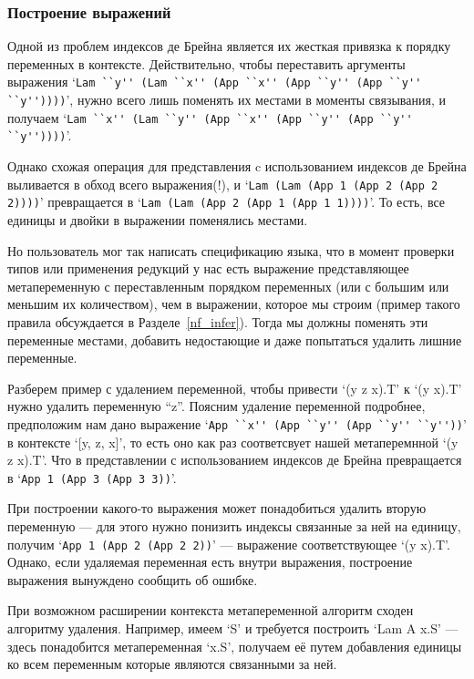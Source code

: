 \subsubsection{Построение выражений}\label{build_exp}
Одной из проблем индексов де Брейна является их жесткая привязка к порядку переменных в контексте. Действительно, чтобы переставить аргументы выражения `\lstinline{Lam ``y'' (Lam ``x'' (App ``x'' (App ``y'' (App ``y'' ``y''))))}', нужно всего лишь поменять их местами в моменты связывания, и получаем `\lstinline{Lam ``x'' (Lam ``y'' (App ``x'' (App ``y'' (App ``y'' ``y''))))}'.

Однако схожая операция для представления c использованием индексов де Брейна выливается в обход всего выражения(!), и `\lstinline{Lam (Lam (App 1 (App 2 (App 2 2))))}' превращается в `\lstinline{Lam (Lam (App 2 (App 1 (App 1 1))))}'. То есть, все единицы и двойки в выражении поменялись местами.

Но пользователь мог так написать спецификацию языка, что в момент проверки типов или применения редукций у нас есть выражение представляющее метапеременную с переставленным порядком переменных (или с большим или меньшим их количеством), чем в выражении, которое мы строим (пример такого правила обсуждается в Разделе~\ref{nf_infer}). Тогда мы должны поменять эти переменные местами, добавить недостающие и даже попытаться удалить лишние переменные.

Разберем пример с удалением переменной, чтобы привести `(y z x).T' к `(y x).T' нужно удалить переменную ``z''. Поясним удаление переменной подробнее, предположим нам дано выражение `\lstinline{App ``x'' (App ``y'' (App ``y'' ``y''))}' в контексте `[y, z, x]', то есть оно как раз соответсвует нашей метаперемнной `(y z x).T'. Что в представлении с использованием индексов де Брейна превращается в `\lstinline{App 1 (App 3 (App 3 3))}'.

При построении какого-то выражения может понадобиться удалить вторую переменную --- для этого нужно понизить индексы связанные за ней на единицу, получим `\lstinline{App 1 (App 2 (App 2 2))}' --- выражение соответствующее `(y x).T'. Однако, если удаляемая переменная есть внутри выражения, построение выражения вынуждено сообщить об ошибке.

При возможном расширении контекста метапеременной алгоритм сходен алгоритму удаления. Например, имеем `S' и требуется построить `Lam A x.S' --- здесь понадобится метапеременная `x.S', получаем её путем добавления единицы ко всем переменным которые являются связанными за ней.

